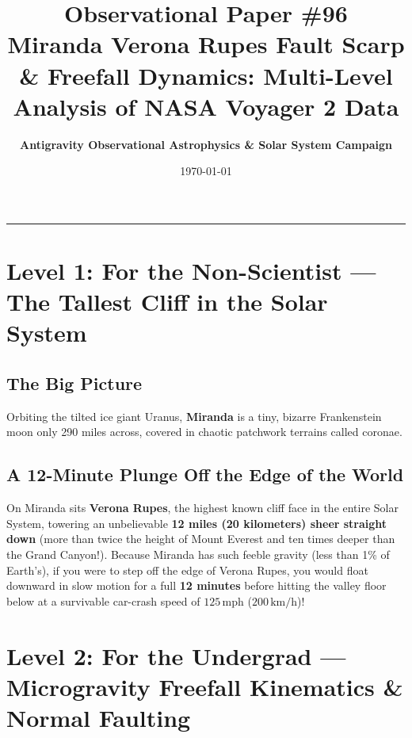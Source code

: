 \documentclass[11pt,a4paper]{article}
\title{\Huge \textbf{Observational Paper \#96}\\ \Large Miranda Verona Rupes Fault Scarp \& Freefall Dynamics: Multi-Level Analysis of NASA Voyager 2 Data}
\author{\textbf{Antigravity Observational Astrophysics \& Solar System Campaign}}
\date{\today}
\begin{document}
\maketitle

\vspace{-1em}
\begin{center}
\rule{\textwidth}{1.5pt}
\end{center}

\section*{Level 1: For the Non-Scientist — The Tallest Cliff in the Solar System}

\subsection*{The Big Picture}
Orbiting the tilted ice giant Uranus, \textbf{Miranda} is a tiny, bizarre Frankenstein moon only 290 miles across, covered in chaotic patchwork terrains called coronae.

\subsection*{A 12-Minute Plunge Off the Edge of the World}
On Miranda sits \textbf{Verona Rupes}, the highest known cliff face in the entire Solar System, towering an unbelievable \textbf{12 miles (20 kilometers) sheer straight down} (more than twice the height of Mount Everest and ten times deeper than the Grand Canyon!). Because Miranda has such feeble gravity (less than 1\% of Earth's), if you were to step off the edge of Verona Rupes, you would float downward in slow motion for a full \textbf{12 minutes} before hitting the valley floor below at a survivable car-crash speed of $125\,\text{mph}$ ($200\,\text{km/h}$)!

\newpage

\section*{Level 2: For the Undergrad — Microgravity Freefall Kinematics \& Normal Faulting}
\end{document}
